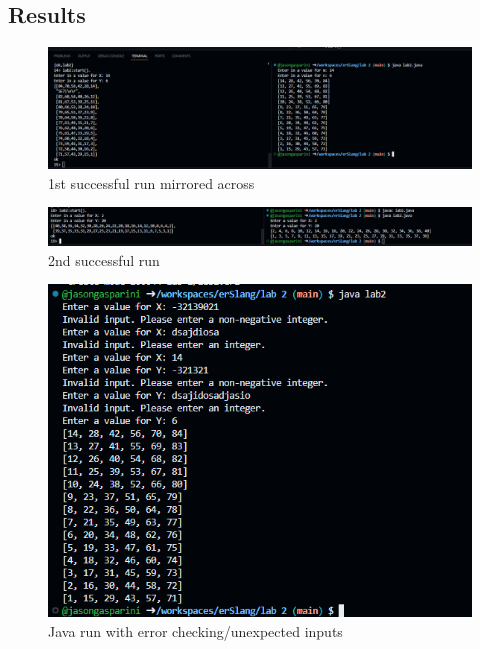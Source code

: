 \documentclass[letterpaper, 10pt]{article}
\begin{document}
\subsection{Results}

\begin{figure}[htbp]
    \centering
    \includegraphics[width=\textwidth]{1.png}
    \caption{1st successful run mirrored across}
    \label{fig:1}
\end{figure}


\begin{figure}[htbp]
    \centering
    \includegraphics[width=\textwidth]{2.png}
    \caption{2nd successful run}
    \label{fig:2}
\end{figure}

\begin{figure}[htbp]
    \centering
    \includegraphics[width=\textwidth]{3.png}
    \caption{Java run with error checking/unexpected inputs}
    \label{fig:3}
\end{figure}
\end{document}
